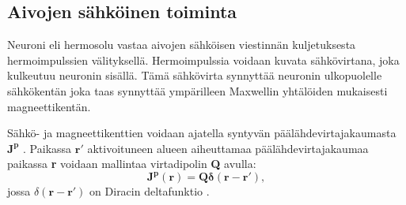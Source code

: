 \subsection{Aivojen sähköinen toiminta}
Neuroni eli hermosolu vastaa aivojen sähköisen viestinnän kuljetuksesta hermoimpulssien välityksellä. Hermoimpulssia voidaan kuvata sähkövirtana, joka kulkeutuu neuronin sisällä. Tämä sähkövirta synnyttää neuronin ulkopuolelle sähkökentän joka taas synnyttää ympärilleen Maxwellin yhtälöiden mukaisesti magneettikentän.

Sähkö- ja magneettikenttien voidaan ajatella syntyvän päälähdevirtajakaumasta $\mathbf{J^p}$ \citep{Sarvas1987Basic}. Paikassa $\mathbf{r'}$ aktivoituneen alueen aiheuttamaa päälähdevirtajakaumaa paikassa \textbf{r} voidaan mallintaa virtadipolin \textbf{Q} avulla:
\begin{equation}
    \mathbf{J^p(r) = Q\delta (r-r')},
\end{equation}
jossa $\delta (\mathbf{r-r'})$ on Diracin deltafunktio \citep{Baillet2001ElectromagneticMapping}.


